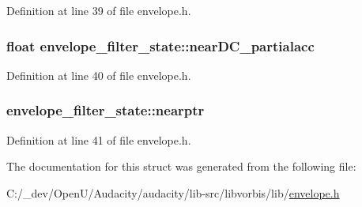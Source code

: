 Definition at line 39 of file envelope.\+h.

\subsubsection[{\texorpdfstring{near\+D\+C\+\_\+partialacc}{nearDC_partialacc}}]{\setlength{\rightskip}{0pt plus 5cm}float envelope\+\_\+filter\+\_\+state\+::near\+D\+C\+\_\+partialacc}\hypertarget{structenvelope__filter__state_a4a0afe63b73ff77a8486aa1385a617de}{}\label{structenvelope__filter__state_a4a0afe63b73ff77a8486aa1385a617de}


Definition at line 40 of file envelope.\+h.

\subsubsection[{\texorpdfstring{nearptr}{nearptr}}]{ envelope\+\_\+filter\+\_\+state\+::nearptr}\hypertarget{structenvelope__filter__state_ac0f52e7fd7930f3ed8b72c7d27aef47f}{}\label{structenvelope__filter__state_ac0f52e7fd7930f3ed8b72c7d27aef47f}


Definition at line 41 of file envelope.\+h.



The documentation for this struct was generated from the following file\+:\begin{DoxyCompactItemize}
\item 
C\+:/\+\_\+dev/\+Open\+U/\+Audacity/audacity/lib-\/src/libvorbis/lib/\hyperlink{lib-src_2libvorbis_2lib_2_envelope_8h}{envelope.\+h}\end{DoxyCompactItemize}
